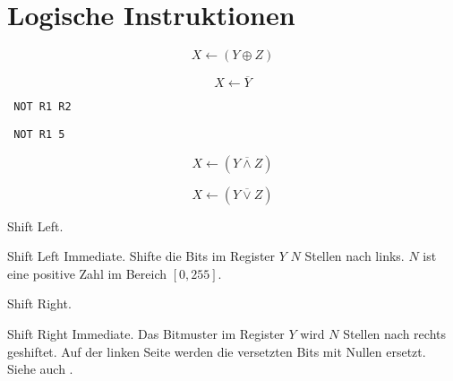 \section{Logische Instruktionen}









\[
    X \gets (Y \oplus Z)
\]




\[
    X \gets \overline{Y}
\]
\begin{lstlisting}
 NOT R1 R2
\end{lstlisting}




\begin{lstlisting}
 NOT R1 5
\end{lstlisting}


\[
    X \gets (Y \overline{\land} Z)
\]





\[
    X \gets (Y \overline{\lor} Z)
\]




\glqq Shift Left\grqq.



\glqq Shift Left Immediate\grqq.
Shifte die Bits im Register $Y$ $N$ Stellen nach links. $N$ ist eine positive 
Zahl im Bereich $[0, 255]$.




\glqq Shift Right\grqq.


\glqq Shift Right Immediate\grqq.
Das Bitmuster im Register $Y$ wird $N$ Stellen nach rechts geshiftet.
Auf der linken Seite werden die versetzten Bits mit Nullen ersetzt.
Siehe auch .



